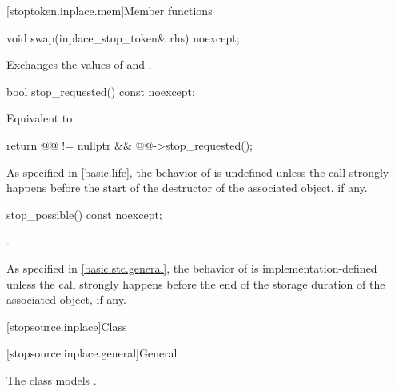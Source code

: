 [stoptoken.inplace.mem]{Member functions}

\begin{itemdecl}
void swap(inplace_stop_token& rhs) noexcept;
\end{itemdecl}

\begin{itemdescr}
\pnum
\effects
Exchanges the values of  and .
\end{itemdescr}

\begin{itemdecl}
bool stop_requested() const noexcept;
\end{itemdecl}

\begin{itemdescr}
\pnum
\effects
Equivalent to:
\begin{codeblock}
return @@ != nullptr && @@->stop_requested();
\end{codeblock}

\pnum
\begin{note}
As specified in \ref{basic.life},
the behavior of  is undefined
unless the call strongly happens before the start of
the destructor of the associated  object, if any.
\end{note}
\end{itemdescr}

\begin{itemdecl}
stop_possible() const noexcept;
\end{itemdecl}

\begin{itemdescr}
\pnum
\returns
{}.

\pnum
\begin{note}
As specified in \ref{basic.stc.general},
the behavior of  is implementation-defined
unless the call strongly happens before
the end of the storage duration of
the associated  object, if any.
\end{note}
\end{itemdescr}

[stopsource.inplace]{Class }

[stopsource.inplace.general]{General}

\pnum
The class  models .


